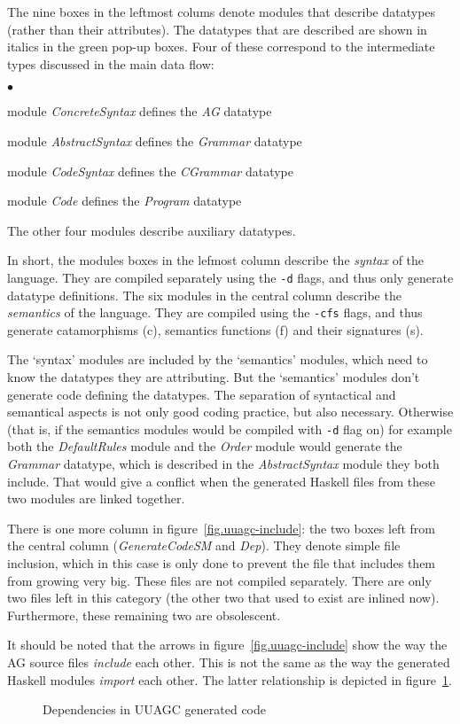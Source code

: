 \documentclass[twoside]{article}
\newenvironment{itize}{\begin{list}{$\bullet$}{\parsep=0pt\parskip=0pt\topsep=0pt\itemsep=0pt}}{\end{list}}
\newcommand{\simplepicture}[2]{\centerline{\mbox{\texttt{[image: figs/\#2]}}}}
\begin{document}
The nine boxes in the leftmost colums denote modules that describe datatypes
(rather than their attributes).
The datatypes that are described are shown in italics in the green pop-up boxes.
Four of these correspond to the intermediate types discussed in the main data flow:
\begin{itize}
\item module {\em ConcreteSyntax} defines the {\em AG} datatype
\item module {\em AbstractSyntax} defines the {\em Grammar} datatype
\item module {\em CodeSyntax} defines the {\em CGrammar} datatype
\item module {\em Code} defines the {\em Program} datatype
\end{itize}
The other four modules describe auxiliary datatypes.

In short, the modules boxes in the lefmost column describe the {\em syntax}
of the language. 
They are compiled separately using the \verb"-d" flags, and thus only generate datatype definitions.
The six modules in the central column describe the {\em semantics}
of the language. 
They are compiled using the \verb"-cfs" flags, and thus generate catamorphisms (c),
semantics functions (f) and their signatures (s).

The `syntax' modules are included by the `semantics' modules, which need to know
the datatypes they are attributing.
But the `semantics' modules don't generate code defining the datatypes.
The separation of syntactical and semantical aspects is not only 
good coding practice, but also necessary.
Otherwise (that is, if the semantics modules would be compiled with \verb"-d" flag on)
for example both the {\em DefaultRules} module and the {\em Order} module would generate
the {\em Grammar} datatype, which is described in the {\em AbstractSyntax} module they both include.
That would give a conflict when the generated Haskell files from these two modules are linked together.

There is one more column in figure~\ref{fig.uuagc-include}: the two boxes left from the central column
({\em GenerateCodeSM} and {\em Dep}).
They denote simple file inclusion, which in this case is only done to prevent the file that includes
them from growing very big. These files are not compiled separately.
There are only two files left in this category
(the other two that used to exist are inlined now).
Furthermore, these remaining two are obsolescent.

It should be noted that the arrows in figure~\ref{fig.uuagc-include}
show the way the AG source files {\em include} each other.
This is not the same as the way the generated Haskell modules {\em import} each other.
The latter relationship is depicted in figure~\ref{fig.uuagc-import}.
\begin{figure}[htbp]
\raisebox{0mm}{\simplepicture{0.7}{uuagc-import}}
\caption{Dependencies in UUAGC generated code}
\label{fig.uuagc-import}
\end{figure}
\end{document}
